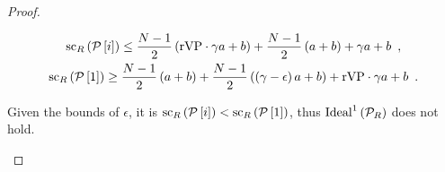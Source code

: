 \documentclass[a4paper,english,cleveref, autoref]{oasics-v2019}
\begin{document}
\begin{subappendices}
\begin{proof}
\begin{itemize}
    \begin{gather*}
      \mathrm{sc}_{R}\left(\mathcal{P}\left[i\right]\right) \leq
      \frac{N - 1}{2}\left(\mathrm{rVP} \cdot \gamma a + b\right) +
      \frac{N - 1}{2}\left(a + b\right) + \gamma a + b \enspace, \\
      \mathrm{sc}_{R}\left(\mathcal{P}\left[1\right]\right) \geq
      \frac{N - 1}{2}\left(a + b\right) + \frac{N -
      1}{2}\left(\left(\gamma - \epsilon\right) a + b\right) + \mathrm{rVP} \cdot \gamma
      a + b \enspace.
    \end{gather*}

    Given the bounds of $\epsilon$, it is
    $\mathrm{sc}_{R}\left(\mathcal{P}\left[i\right]\right) <
    \mathrm{sc}_{R}\left(\mathcal{P}\left[1\right]\right)$, thus
    $\mathrm{Ideal}^1\left(\mathcal{P}_{R}\right)$ does not hold.
  \end{itemize}
\end{proof}
\newpage

\end{subappendices}
\end{document}

